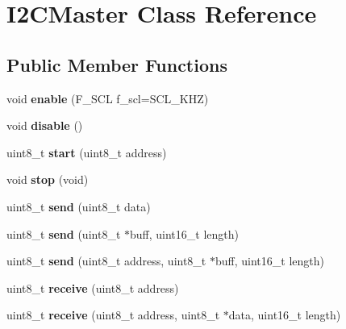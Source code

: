 \hypertarget{classI2CMaster}{}\section{I2\+C\+Master Class Reference}
\label{classI2CMaster}
\subsection*{Public Member Functions}
\begin{DoxyCompactItemize}
\item 
\mbox{\label{classI2CMaster_ac9d3207e9fab769eed77b183a4b730aa}} 
void {\bfseries enable} (F\+\_\+\+S\+CL f\+\_\+scl=S\+C\+L\+\_\+K\+HZ)
\item 
\mbox{\label{classI2CMaster_acd2d2d5f67df795ea7fef95cb007f7fc}} 
void {\bfseries disable} ()
\item 
\mbox{\label{classI2CMaster_a88533525021e772d710ff34e43a0053c}} 
uint8\+\_\+t {\bfseries start} (uint8\+\_\+t address)
\item 
\mbox{\label{classI2CMaster_a043dbcfd7c2e19fb5b00cbf72ba7ca49}} 
void {\bfseries stop} (void)
\item 
\mbox{\label{classI2CMaster_a38da9e8a049971c91d476bccc9c6fec5}} 
uint8\+\_\+t {\bfseries send} (uint8\+\_\+t data)
\item 
\mbox{\label{classI2CMaster_a852ab025cc29eeab36105a2f2af369f2}} 
uint8\+\_\+t {\bfseries send} (uint8\+\_\+t $\ast$buff, uint16\+\_\+t length)
\item 
\mbox{\label{classI2CMaster_a62d7e3ab8a463c3ceb8cd04d51443a01}} 
uint8\+\_\+t {\bfseries send} (uint8\+\_\+t address, uint8\+\_\+t $\ast$buff, uint16\+\_\+t length)
\item 
\mbox{\label{classI2CMaster_af5f697ab93e94346b54739ff4a33fb8c}} 
uint8\+\_\+t {\bfseries receive} (uint8\+\_\+t address)
\item 
\mbox{\label{classI2CMaster_a30586cb3867aa0ad8c03a73b6e393bdb}} 
uint8\+\_\+t {\bfseries receive} (uint8\+\_\+t address, uint8\+\_\+t $\ast$data, uint16\+\_\+t length)

\end{DoxyCompactItemize}
